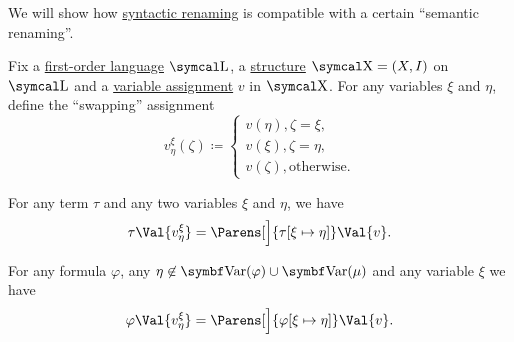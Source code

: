 \begin{proposition}\label{thm:swapping_assignment_compatibility}
  We will show how \hyperref[rem:first_order_substitution_renaming_justification]{syntactic renaming} is compatible with a certain \enquote{semantic renaming}.

  Fix a \hyperref[def:first_order_language]{first-order language} \( \CL \), a \hyperref[def:first_order_structure]{structure} \( \CX = (X, I) \) on \( \CL \) and a \hyperref[def:first_order_valuation/variable_assignment]{variable assignment} \( v \) in \( \CX \). For any variables \( \xi \) and \( \eta \), define the \enquote{swapping} assignment
  \begin{equation}\label{eq:thm:swapping_assignment_compatibility/swapping_assignment}
    v_\eta^\xi(\zeta) \coloneqq \begin{cases}
      v(\eta), \zeta = \xi, \\
      v(\xi), \zeta = \eta, \\
      v(\zeta), \text{otherwise}.
    \end{cases}
  \end{equation}

  \begin{PropEnum}
     For any term \( \tau \) and any two variables \( \xi \) and \( \eta \), we have
    \begin{equation}\label{eq:thm:swapping_assignment_compatibility/terms}
      \tau\Val{v_\eta^\xi}
      =
      \Parens[\Big]{ \tau[\xi \mapsto \eta] }\Val{v}.
    \end{equation}

     For any formula \( \varphi \), any \( \eta \not\in \Bold{Var}(\varphi) \cup \Bold{Var}(\mu) \) and any variable \( \xi \) we have
    \begin{equation}\label{eq:thm:swapping_assignment_compatibility/formulas}
      \varphi\Val{v_\eta^\xi}
      =
      \Parens[\Big]{ \varphi[\xi \mapsto \eta] }\Val{v}.
    \end{equation}
  \end{PropEnum}
\end{proposition}
